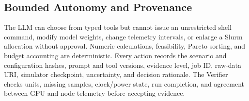 \subsection{Bounded Autonomy and Provenance}

The LLM can choose from typed tools but cannot issue an unrestricted shell
command, modify model weights, change telemetry intervals, or enlarge a Slurm
allocation without approval.  Numeric calculations, feasibility, Pareto
sorting, and budget accounting are deterministic.  Every action records the
scenario and configuration hashes, prompt and tool versions, evidence level,
job ID, raw-data URI, simulator checkpoint, uncertainty, and decision rationale.
The Verifier checks units, missing samples, clock/power state, run completion,
and agreement between GPU and node telemetry before accepting evidence.
